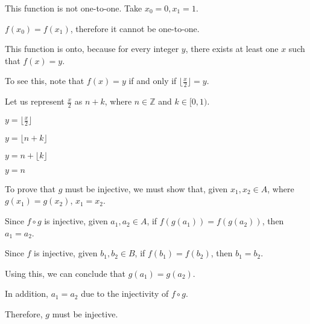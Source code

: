 \documentclass{exam}
\begin{document}
\begin{questions}
\begin{center}
This function is not one-to-one. Take \(x_0 = 0, x_1 = 1\). 

\(f(x_0) = f(x_1)\), therefore it cannot be one-to-one.
\vspace{5px}

This function is onto, because for every integer \(y\), there exists at least one \(x\) such that \(f(x) = y\). 

To see this, note that \(f(x) = y\) if and only if \(\lfloor \frac{x}{2} \rfloor = y\).

Let us represent \(\frac{x}{2}\) as \(n + k\), where \(n \in \mathbb{Z}\) and \(k \in [0,1)\). 

\( y = \lfloor \frac{x}{2} \rfloor \)

\( y = \lfloor n + k \rfloor \)

\( y = n + \lfloor k \rfloor \)

\( y = n \)

\end{center}

\newpage

\begin{subparts}

\begin{center}

To prove that \(g\) must be injective, we must show that, given \(x_1, x_2 \in A\), where \(g(x_1) = g(x_2)\), \(x_1 = x_2\).

Since \(f \circ g\) is injective, given \(a_1, a_2 \in A\), if \(f(g(a_1)) = f(g(a_2))\), then \(a_1 = a_2\).

Since \(f\) is injective, given \(b_1, b_2 \in B\), if \(f(b_1) = f(b_2)\), then \(b_1 = b_2\).

Using this, we can conclude that \(g(a_1) = g(a_2)\).

In addition, \(a_1 = a_2\) due to the injectivity of \(f \circ g\).

Therefore, \(g\) must be injective.

\end{center}
\vspace{5px}


\begin{center}


\end{center}
\end{subparts}
\end{questions}
\end{document}

